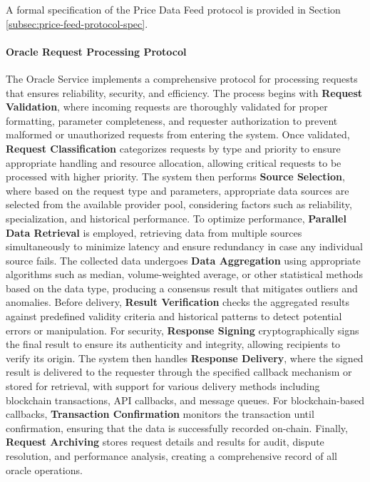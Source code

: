\documentclass[11pt]{article}
\begin{document}
A formal specification of the Price Data Feed protocol is provided in Section \ref{subsec:price-feed-protocol-spec}.



\paragraph{Oracle Request Processing Protocol}
The Oracle Service implements a comprehensive protocol for processing requests that ensures reliability, security, and efficiency. The process begins with \textbf{Request Validation}, where incoming requests are thoroughly validated for proper formatting, parameter completeness, and requester authorization to prevent malformed or unauthorized requests from entering the system. Once validated, \textbf{Request Classification} categorizes requests by type and priority to ensure appropriate handling and resource allocation, allowing critical requests to be processed with higher priority. The system then performs \textbf{Source Selection}, where based on the request type and parameters, appropriate data sources are selected from the available provider pool, considering factors such as reliability, specialization, and historical performance. To optimize performance, \textbf{Parallel Data Retrieval} is employed, retrieving data from multiple sources simultaneously to minimize latency and ensure redundancy in case any individual source fails. The collected data undergoes \textbf{Data Aggregation} using appropriate algorithms such as median, volume-weighted average, or other statistical methods based on the data type, producing a consensus result that mitigates outliers and anomalies. Before delivery, \textbf{Result Verification} checks the aggregated results against predefined validity criteria and historical patterns to detect potential errors or manipulation. For security, \textbf{Response Signing} cryptographically signs the final result to ensure its authenticity and integrity, allowing recipients to verify its origin. The system then handles \textbf{Response Delivery}, where the signed result is delivered to the requester through the specified callback mechanism or stored for retrieval, with support for various delivery methods including blockchain transactions, API callbacks, and message queues. For blockchain-based callbacks, \textbf{Transaction Confirmation} monitors the transaction until confirmation, ensuring that the data is successfully recorded on-chain. Finally, \textbf{Request Archiving} stores request details and results for audit, dispute resolution, and performance analysis, creating a comprehensive record of all oracle operations.
\end{document}
